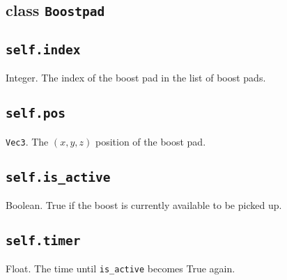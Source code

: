 \documentclass{article}
\newcommand{\class}[1]{\section{class \texttt{#1}}}
\newcommand{\attribute}[1]{\subsection{\texttt{self.#1}}}
\begin{document}
\begin{flushleft}
\class{Boostpad}
      {
        \attribute{index}
                  {
                    Integer.  The index of the boost pad in the list of boost pads.
                  }
        \attribute{pos}
                  {
                    \texttt{Vec3}. The $(x,y,z)$ position of the boost pad.
                  }
        \attribute{is\_active}
                  {
                    Boolean.  True if the boost is currently available to be picked up.
                  }
        \attribute{timer}
                  {
                    Float.  The time until \texttt{is\_active} becomes True again.
                  }
        
      }


















      
      





































  
  





\end{flushleft}
\end{document}
